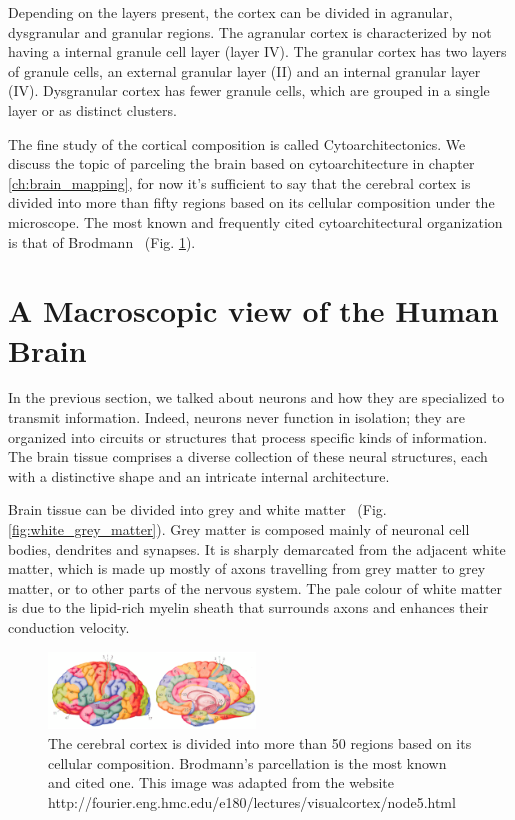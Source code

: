 Depending on the layers present, the cortex can be divided in agranular,
dysgranular and granular regions\cite{Mesulam1982}. The agranular cortex is characterized by not
having a internal granule cell layer (layer IV). The granular cortex has two 
layers of granule cells, an external granular layer (II) and an internal granular
layer (IV). Dysgranular cortex has fewer granule cells, which are grouped in a
single layer or as distinct clusters.



The fine study of the cortical composition is called Cytoarchitectonics. We 
discuss the topic of parceling the brain based on cytoarchitecture in chapter
\ref{ch:brain_mapping}, for now it's sufficient to say that the cerebral cortex is divided into more than
fifty regions based on its cellular composition under the microscope. The most
known and frequently cited cytoarchitectural organization is that of
Brodmann~\cite{Brodmann1909} (Fig. \ref{fig:brodmann_small}).


\section{A Macroscopic view of the Human Brain}
In the previous section, we talked about neurons and how they are specialized
to transmit information. Indeed, neurons never function in isolation; they are
organized into circuits or structures that process specific kinds of information.
The brain tissue comprises a diverse collection of these neural structures,
each with a distinctive shape and an intricate internal architecture.

Brain tissue can be divided into grey and white matter~\cite{Johns} (Fig. \ref{fig:white_grey_matter}).
Grey matter is composed mainly of neuronal cell bodies, dendrites and synapses.
It is sharply demarcated from the adjacent white matter, which is made up mostly
of axons travelling from grey matter to grey matter, or to other parts of the
nervous system. The pale colour of white matter is due to the lipid-rich myelin
sheath that surrounds axons and enhances their conduction velocity\cite{Johns}.
\begin{figure}[t!]
    \includegraphics[width=0.49\textwidth]{2.neuroanatomy/img/brodmann.png}
    \caption{The cerebral cortex is divided into more than 50 regions based on
             its cellular composition. Brodmann's\cite{Brodmann1909}
             parcellation is the most known and cited one. This image was
             adapted from the website http://fourier.eng.hmc.edu/e180/lectures/visualcortex/node5.html}
    \label{fig:brodmann_small}
\end{figure}

